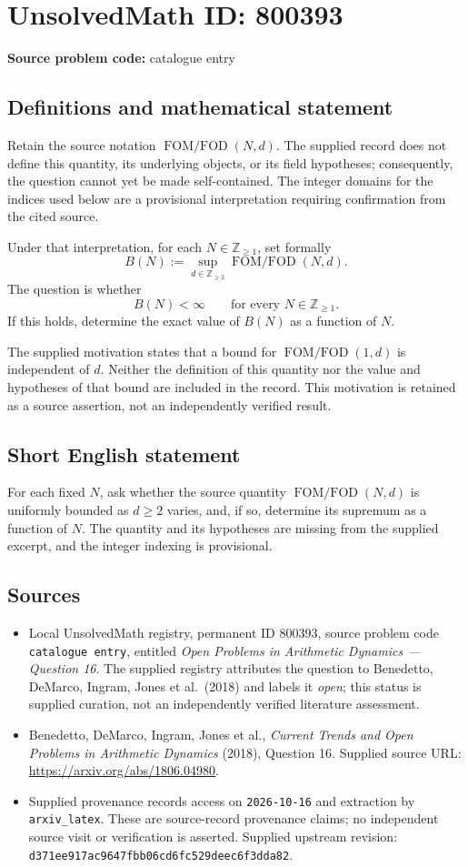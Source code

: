 \documentclass[11pt]{article}
\newcommand{\Z}{\mathbb{Z}}
\begin{document}
\section*{UnsolvedMath ID: 800393}
\textbf{Source problem code:} catalogue entry
\subsection{Definitions and mathematical statement}
Retain the source notation \(\operatorname{FOM/FOD}(N,d)\). The supplied record does not define this quantity, its underlying objects, or its field hypotheses; consequently, the question cannot yet be made self-contained. The integer domains for the indices used below are a provisional interpretation requiring confirmation from the cited source.

Under that interpretation, for each \(N\in\Z_{\ge1}\), set formally
\[
B(N):=\sup_{d\in\Z_{\ge2}}\operatorname{FOM/FOD}(N,d).
\]
The question is whether
\[
B(N)<\infty\qquad\text{for every }N\in\Z_{\ge1}.
\]
If this holds, determine the exact value of \(B(N)\) as a function of \(N\).

The supplied motivation states that a bound for \(\operatorname{FOM/FOD}(1,d)\) is independent of \(d\). Neither the definition of this quantity nor the value and hypotheses of that bound are included in the record. This motivation is retained as a source assertion, not an independently verified result.
\subsection{Short English statement}
For each fixed \(N\), ask whether the source quantity \(\operatorname{FOM/FOD}(N,d)\) is uniformly bounded as \(d\ge2\) varies, and, if so, determine its supremum as a function of \(N\). The quantity and its hypotheses are missing from the supplied excerpt, and the integer indexing is provisional.
\subsection{Sources}
\begin{itemize}
\item Local UnsolvedMath registry, permanent ID \(800393\), source problem code \texttt{catalogue entry}, entitled \emph{Open Problems in Arithmetic Dynamics --- Question 16}. The supplied registry attributes the question to Benedetto, DeMarco, Ingram, Jones et al.\ (2018) and labels it \emph{open}; this status is supplied curation, not an independently verified literature assessment.
\item Benedetto, DeMarco, Ingram, Jones et al., \emph{Current Trends and Open Problems in Arithmetic Dynamics} (2018), Question 16. Supplied source URL: \url{https://arxiv.org/abs/1806.04980}.
\item Supplied provenance records access on \texttt{2026-10-16} and extraction by \texttt{arxiv\_latex}. These are source-record provenance claims; no independent source visit or verification is asserted. Supplied upstream revision: \texttt{d371ee917ac9647fbb06cd6fc529deec6f3dda82}.
\end{itemize}
\end{document}
